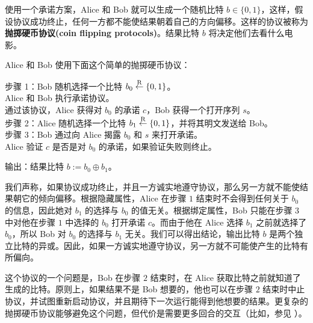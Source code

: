 \begin{snote}[抛掷硬币。]
使用一个承诺方案，Alice 和 Bob 就可以生成一个随机比特 $b\in\{0,1\}$，这样，假设协议成功终止，任何一方都不能使结果朝着自己的方向偏移。这样的协议被称为\textbf{抛掷硬币协议(coin flipping protocols)}。结果比特 $b$ 将决定他们去看什么电影。

Alice 和 Bob 使用下面这个简单的抛掷硬币协议：

\vspace*{10pt}

\hspace*{5pt} 步骤 1：Bob 随机选择一个比特 $b_0\overset{\rm R}\leftarrow\{0,1\}$。\\
\hspace*{66pt} Alice 和 Bob 执行承诺协议。\\
\hspace*{66pt} 通过该协议，Alice 获得对 $b_0$ 的承诺 $c$，Bob 获得一个打开序列 $s$。\\
\hspace*{26pt} 步骤 2：Alice 随机选择一个比特 $b_1\overset{\rm R}\leftarrow\{0,1\}$，并将其明文发送给 Bob。\\
\hspace*{26pt} 步骤 3：Bob 通过向 Alice 揭露 $b_0$ 和 $s$ 来打开承诺。\\
\hspace*{66pt} Alice 验证 $c$ 是否是对 $b_0$ 的承诺，如果验证失败则终止。

\vspace*{5pt}

\hspace*{5pt} 输出：结果比特 $b:=b_0\oplus b_1$。

\vspace*{10pt}

\noindent
我们声称，如果协议成功终止，并且一方诚实地遵守协议，那么另一方就不能使结果朝它的倾向偏移。根据隐藏属性，Alice 在步骤 $1$ 结束时不会得到任何关于 $b_0$ 的信息，因此她对 $b_1$ 的选择与 $b_0$ 的值无关。根据绑定属性，Bob 只能在步骤 $3$ 中对他在步骤 $1$ 中选择的 $b_0$ 打开承诺 $c$。而由于他在 Alice 选择 $b_1$ 之前就选择了 $b_0$，所以 Bob 对 $b_0$ 的选择与 $b_1$ 无关。我们可以得出结论，输出比特 $b$ 是两个独立比特的异或。因此，如果一方诚实地遵守协议，另一方就不可能使产生的比特有所偏向。

这个协议的一个问题是，Bob 在步骤 $2$ 结束时，在 Alice 获取比特之前就知道了生成的比特。原则上，如果结果不是 Bob 想要的，他也可以在步骤 $2$ 结束时中止协议，并试图重新启动协议，并且期待下一次运行能得到他想要的结果。更复杂的抛掷硬币协议能够避免这个问题，但代价是需要更多回合的交互（比如，参见 \cite{}）。
\end{snote}

